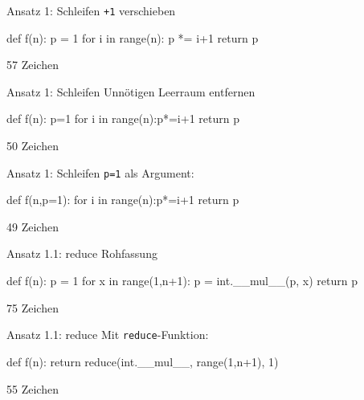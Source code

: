 \documentclass[xcolor=dvipsnames, aspectratio=169, 14pt]{beamer}
\begin{document}
\begin{frame}[fragile]{Ansatz 1: Schleifen}
	\texttt{+1} verschieben\strut
	
	\vfill
	
	\begin{python3code}
	def f(n):
	   p = 1
	   for i in range(n):
	      p *= i+1
	   return p
	\end{python3code}
	
	\vfill
	
	57 Zeichen
\end{frame}

\begin{frame}[fragile]{Ansatz 1: Schleifen}
	Unnötigen Leerraum entfernen
	
	\vfill
	
	\begin{python3code}
	def f(n):
	   p=1
	   for i in range(n):p*=i+1
	   return p
	\end{python3code}
	
	\vfill
	
	50 Zeichen
\end{frame}

\begin{frame}[fragile]{Ansatz 1: Schleifen}
	\texttt{p=1} als Argument:
	
	\vfill
	
	\begin{python3code}
	def f(n,p=1):
	   for i in range(n):p*=i+1
	   return p
	\end{python3code}
	
	\vfill
	
	49 Zeichen
\end{frame}

\begin{frame}[fragile]{Ansatz 1.1: reduce}
	Rohfassung
	
	\vfill
	
	\begin{python3code}
	def f(n):
	   p = 1
	   for x in range(1,n+1):
	      p = int.__mul__(p, x)
	   return p
	\end{python3code}
	
	\vfill
	
	75 Zeichen
\end{frame}

\begin{frame}[fragile]{Ansatz 1.1: reduce}
	Mit \texttt{reduce}-Funktion:
	
	\vfill
	
	\begin{python3code}
	def f(n):
	   return reduce(int.__mul__, range(1,n+1), 1)
	\end{python3code}
	
	\vfill
	
	55 Zeichen
\end{frame}
\end{document}
